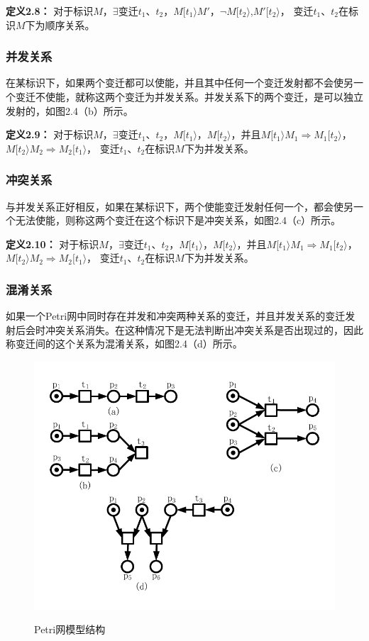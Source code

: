     \textbf{定义2.8}\cite{petri}\textbf{：}
    对于标识$M$，$\exists $变迁$t_{1}$、$t_{2}$，$M[t_1\rangle M'$，$\lnot M[t_2\rangle$,$M'[t_2\rangle$，
    变迁$t_{1}$、$t_{2}$在标识$M$下为顺序关系。
    \subsubsection{并发关系}
    在某标识下，如果两个变迁都可以使能，并且其中任何一个变迁发射都不会使另一个变迁不使能，就称这两个变迁为并发关系。并发关系下的两个变迁，是可以独立发射的，如图2.4（b）所示。

    \textbf{定义2.9}\cite{petri}\textbf{：}
    对于标识$M$，$\exists $变迁$t_{1}$、$t_{2}$，$M[t_1\rangle$，$M[t_2\rangle$，并且$M[t_1\rangle M_1\Rightarrow M_1[t_2\rangle$，$M[t_2\rangle M_2\Rightarrow M_2[t_1\rangle$，
    变迁$t_{1}$、$t_{2}$在标识$M$下为并发关系。
    \subsubsection{冲突关系}
    与并发关系正好相反，如果在某标识下，两个使能变迁发射任何一个，都会使另一个无法使能，则称这两个变迁在这个标识下是冲突关系，如图2.4（c）所示。

    \textbf{定义2.10}\cite{petri}\textbf{：}
    对于标识$M$，$\exists $变迁$t_{1}$、$t_{2}$，$M[t_1\rangle$，$M[t_2\rangle$，并且$M[t_1\rangle M_1\Rightarrow M_1[t_2\rangle$，$M[t_2\rangle M_2\Rightarrow M_2[t_1\rangle$，
    变迁$t_{1}$、$t_{2}$在标识$M$下为并发关系。
    \subsubsection{混淆关系}
    如果一个Petri网中同时存在并发和冲突两种关系的变迁，并且并发关系的变迁发射后会时冲突关系消失。在这种情况下是无法判断出冲突关系是否出现过的，因此称变迁间的这个关系为混淆关系，如图2.4（d）所示。

    \begin{figure}[H]
        \centering
        \includegraphics[scale=0.7,angle=0]{figures/figure2-4.pdf}\\
        \caption{Petri网模型结构}
    \end{figure}

